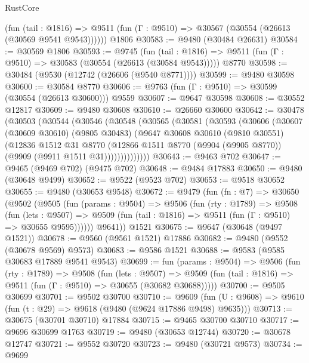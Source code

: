 \begin{lexlean}{RustCore}
\begin{coremodule}
      (fun (tail : @1816) =>
      @9511 (fun (Γ : @9510) => @30567 (@30554 (@26613 (@30569 @9541 @9543))))))
    @1806
@30583 := @9480 (@30484 @26631)
@30584 := @30569 @1806
@30593 := @9745
    (fun (tail : @1816) => @9511 (fun (Γ : @9510) => @30583 (@30554 (@26613 (@30584 @9543)))))
    @8770
@30598 := @30484 (@9530 (@12742 (@26606 (@9540 @8771))))
@30599 := @9480 @30598
@30600 := @30584 @8770
@30606 := @9763 (fun (Γ : @9510) => @30599 (@30554 (@26613 @30600))) @9559
@30607 := @9647 @30598
@30608 := @30552 @12817
@30609 := @9480 @30608
@30610 := @26660 @30600
@30642 := @30478
    (@30503
      (@30544
        (@30546
          (@30548
            (@30565
              (@30581
                (@30593
                  (@30606
                    (@30607
                      (@30609 @30610)
                      (@9805 @30483)
                      (@9647
                        @30608
                        @30610
                        (@9810 @30551)
                        (@12836
                          @1512
                          @31
                          @8770
                          (@12866
                            @1511
                            @8770
                            (@9904 (@9905 @8770))
                            (@9909 (@9911 @1511 @31))))))))))))))
@30643 := @9463 @702
@30647 := @9465 (@9469 @702) (@9475 @702)
@30648 := @9484 @17883
@30650 := @9480 (@30648 @9499)
@30652 := @9522 (@9523 @702)
@30653 := @9518 @30652
@30655 := @9480 (@30653 @9548)
@30672 := @9479
    (fun (fn : @7) =>
    @30650
      (@9502
        (@9505
          (fun (params : @9504) =>
          @9506
            (fun (rty : @1789) =>
            @9508
              (fun (lets : @9507) =>
              @9509 (fun (tail : @1816) => @9511 (fun (Γ : @9510) => @30655 @9595))))))
        @9641))
    @1521
@30675 := @9647 (@30648 (@9497 @1521))
@30678 := @9560 (@9561 @1521) @17886
@30682 := @9480 (@9552 (@30678 @9569) @9573)
@30683 := @9586 @1521
@30688 := @9583 (@9585 @30683 @17889 @9541 @9543)
@30699 := fun (params : @9504) =>
  @9506
    (fun (rty : @1789) =>
    @9508
      (fun (lets : @9507) =>
      @9509 (fun (tail : @1816) => @9511 (fun (Γ : @9510) => @30655 (@30682 @30688)))))
@30700 := @9505 @30699
@30701 := @9502 @30700
@30710 := @9609
    (fun (U : @9608) => @9610 (fun (t : @29) => @9618 (@9480 (@9624 @17886 @9498) @9635)))
@30713 := @30675 (@30701 @30710) @17884
@30715 := @9465 @30700 @30710
@30717 := @9696 @30699 @1763
@30719 := @9480 (@30653 @12744)
@30720 := @30678 @12747
@30721 := @9552 @30720
@30723 := @9480 (@30721 @9573)
@30734 := @9699

\end{coremodule}
\end{lexlean}
